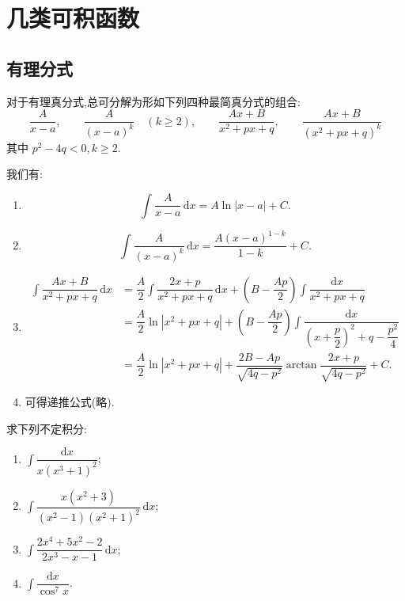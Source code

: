 \newpage

\section{几类可积函数}


\subsection{有理分式}

对于有理真分式,总可分解为形如下列四种最简真分式的组合:
\[
    \dfrac{A}{x-a},\qquad
    \dfrac{A}{(x-a)^k}\quad(k\geq2),\qquad
    \dfrac{Ax+B}{x^2+px+q},\qquad
    \dfrac{Ax+B}{(x^2+px+q)^k}
\]
其中 $p^2-4q<0,k\geq2$.

我们有:
\begin{enumerate}
    \item
          \[
              \displaystyle\int\dfrac{A}{x-a}\,\mathrm{d}x=A\ln|x-a|+C.
          \]
    \item
          \[
              \displaystyle\int\dfrac{A}{(x-a)^k}\,\mathrm{d}x
              =\dfrac{A(x-a)^{1-k}}{1-k}+C.
          \]
    \item
          \begin{align*}
              \displaystyle\int\dfrac{Ax+B}{x^2+px+q}\,\mathrm{d}x
               & =\dfrac{A}{2}\int\dfrac{2x+p}{x^2+px+q}\,\mathrm{d}x
              +\left(B-\dfrac{Ap}{2}\right)\int\dfrac{\mathrm{d}x}{x^2+px+q}          \\
               & =\dfrac{A}{2}\ln|x^2+px+q|
              +\left(B-\dfrac{Ap}{2}\right)
              \int\dfrac{\mathrm{d}x}{\left(x+\dfrac{p}{2}\right)^2+q-\dfrac{p^2}{4}} \\
               & =\dfrac{A}{2}\ln|x^2+px+q|
              +\dfrac{2B-Ap}{\sqrt{4q-p^2}}
              \arctan\dfrac{2x+p}{\sqrt{4q-p^2}}+C.
          \end{align*}
    \item 可得递推公式(略).
\end{enumerate}

\begin{example}
    求下列不定积分:
    \begin{enumerate}
        \item $\displaystyle\int\dfrac{\mathrm{d}x}{x(x^3+1)^2}$;
        \item $\displaystyle\int\dfrac{x(x^2+3)}{(x^2-1)(x^2+1)^2}\,\mathrm{d}x$;
        \item $\displaystyle\int\dfrac{2x^4+5x^2-2}{2x^3-x-1}\,\mathrm{d}x$;
        \item $\displaystyle\int\dfrac{\mathrm{d}x}{\cos^7x}$.
    \end{enumerate}
\end{example}
\exampleblank


